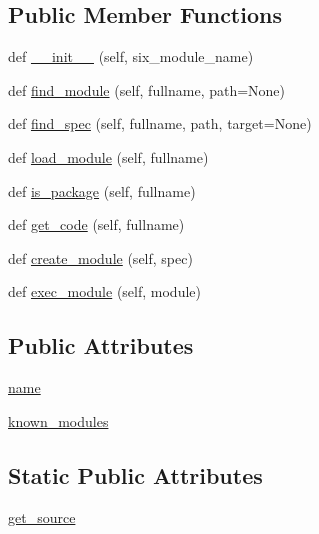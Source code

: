 \subsection*{Public Member Functions}
\begin{DoxyCompactItemize}
\item 
def \hyperlink{classpip_1_1__vendor_1_1six_1_1__SixMetaPathImporter_aa7bb0917de77cf926343c9df2d454f6a}{\+\_\+\+\_\+init\+\_\+\+\_\+} (self, six\+\_\+module\+\_\+name)
\item 
def \hyperlink{classpip_1_1__vendor_1_1six_1_1__SixMetaPathImporter_a8d453f2889fe7d3daa96f4b367a5e1b8}{find\+\_\+module} (self, fullname, path=None)
\item 
def \hyperlink{classpip_1_1__vendor_1_1six_1_1__SixMetaPathImporter_a084379e00271f78d10af639f7f76e723}{find\+\_\+spec} (self, fullname, path, target=None)
\item 
def \hyperlink{classpip_1_1__vendor_1_1six_1_1__SixMetaPathImporter_af4d2ccfec558c02e91324c35dc06587d}{load\+\_\+module} (self, fullname)
\item 
def \hyperlink{classpip_1_1__vendor_1_1six_1_1__SixMetaPathImporter_ab535787f44cc36decb92c75a354315ff}{is\+\_\+package} (self, fullname)
\item 
def \hyperlink{classpip_1_1__vendor_1_1six_1_1__SixMetaPathImporter_aeb9eb8552551acdadedec1576e83552e}{get\+\_\+code} (self, fullname)
\item 
def \hyperlink{classpip_1_1__vendor_1_1six_1_1__SixMetaPathImporter_abe1a1349c49557ea6e4dc6bf6a13c806}{create\+\_\+module} (self, spec)
\item 
def \hyperlink{classpip_1_1__vendor_1_1six_1_1__SixMetaPathImporter_a943cd74e5d1733e8be8e9b2667af947b}{exec\+\_\+module} (self, module)
\end{DoxyCompactItemize}
\subsection*{Public Attributes}
\begin{DoxyCompactItemize}
\item 
\hyperlink{classpip_1_1__vendor_1_1six_1_1__SixMetaPathImporter_a7295ca07c8ec08b0a3c816ab0f17da4a}{name}
\item 
\hyperlink{classpip_1_1__vendor_1_1six_1_1__SixMetaPathImporter_aa1e57b2dd8d238a687bc9cce4297cf5c}{known\+\_\+modules}
\end{DoxyCompactItemize}
\subsection*{Static Public Attributes}
\begin{DoxyCompactItemize}
\item 
\hyperlink{classpip_1_1__vendor_1_1six_1_1__SixMetaPathImporter_ae3498922bb4d0c172f1ef3e7d0ec473e}{get\+\_\+source}
\end{DoxyCompactItemize}


